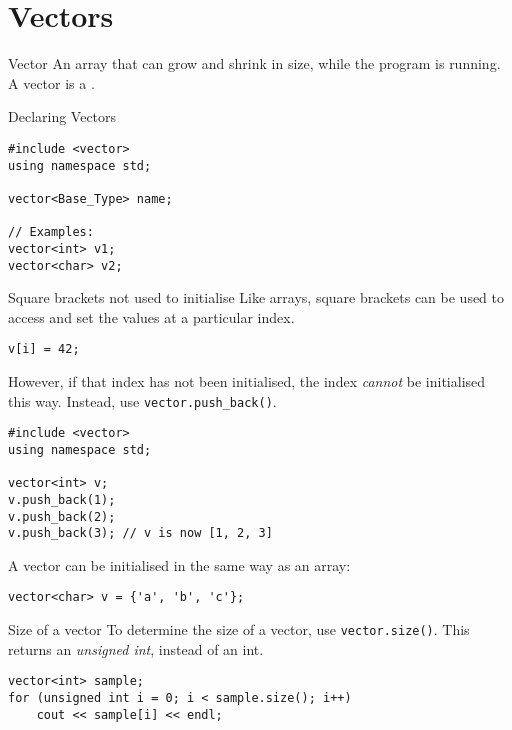 \documentclass[\main/notes.tex]{subfiles}
\begin{document}
		\section{Vectors}
			\begin{definition}{Vector}
				An array that can grow and shrink in size, while the program is running. A vector is a .
			\end{definition}
			\begin{codebox}{Declaring Vectors}
				\begin{verbatim}
#include <vector>
using namespace std;

vector<Base_Type> name;

// Examples:
vector<int> v1;
vector<char> v2;
				\end{verbatim}
			\end{codebox}
			\begin{sidenote}{Square brackets not used to initialise}
				Like arrays, square brackets can be used to access and set the values at a particular index.
				\begin{verbatim}
v[i] = 42;
				\end{verbatim}

				\noindent However, if that index has not been initialised, the index \emph{cannot} be initialised this way. Instead, use \texttt{vector.push_back()}.
				\begin{verbatim}
#include <vector>
using namespace std;

vector<int> v;
v.push_back(1);
v.push_back(2);
v.push_back(3); // v is now [1, 2, 3]
				\end{verbatim}

				\noindent A vector can be initialised in the same way as an array:
				\begin{verbatim}
vector<char> v = {'a', 'b', 'c'};
				\end{verbatim}
			\end{sidenote}
			\begin{sidenote}{Size of a vector}
				To determine the size of a vector, use \texttt{vector.size()}. This returns an \emph{unsigned int}, instead of an int.
				\begin{verbatim}
vector<int> sample;
for (unsigned int i = 0; i < sample.size(); i++)
	cout << sample[i] << endl;
				\end{verbatim}
			\end{sidenote}
\end{document}

